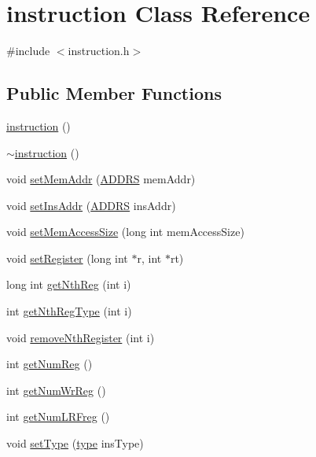 \hypertarget{classinstruction}{
\section{instruction Class Reference}
\label{classinstruction}
}


{\ttfamily \#include $<$instruction.h$>$}

\subsection*{Public Member Functions}
\begin{DoxyCompactItemize}
\item 
\hyperlink{classinstruction_a2e0bfed549166dbfa1ce77ec084ea310}{instruction} ()
\item 
\hyperlink{classinstruction_a4f9c54b6376cf77565179728fa6f68fa}{$\sim$instruction} ()
\item 
void \hyperlink{classinstruction_a69e75dc34c4197b03e33a0032ae03e8f}{setMemAddr} (\hyperlink{global_2global_8h_a7ea74bb9ffd2e4d41550ae2383dd25bc}{ADDRS} memAddr)
\item 
void \hyperlink{classinstruction_ac39145295a94852d0a3efe8c8247473d}{setInsAddr} (\hyperlink{global_2global_8h_a7ea74bb9ffd2e4d41550ae2383dd25bc}{ADDRS} insAddr)
\item 
void \hyperlink{classinstruction_a4e1387f9782160c95597c81694ec0775}{setMemAccessSize} (long int memAccessSize)
\item 
void \hyperlink{classinstruction_a456de8aa26ff79d2b7cd203f7c59f2cb}{setRegister} (long int $\ast$r, int $\ast$rt)
\item 
long int \hyperlink{classinstruction_a54412da0ee022e05101d4fb92ee879b9}{getNthReg} (int i)
\item 
int \hyperlink{classinstruction_a9701f53aafaf1b2298378665059cef33}{getNthRegType} (int i)
\item 
void \hyperlink{classinstruction_aabb46003e886f87cd3bc918f05a3682f}{removeNthRegister} (int i)
\item 
int \hyperlink{classinstruction_af64e1265e882da7e152bd47cb7794c3b}{getNumReg} ()
\item 
int \hyperlink{classinstruction_abe651f9e294dd53e1f515c6856e7e8a3}{getNumWrReg} ()
\item 
int \hyperlink{classinstruction_a71809c767dba335b3bbdad04cb24d43c}{getNumLRFreg} ()
\item 
void \hyperlink{classinstruction_ad9c7d979b5f4b00189973e47caa3411f}{setType} (\hyperlink{binaryTranslator_2global_8h_a7aead736a07eaf25623ad7bfa1f0ee2d}{type} insType)

\end{DoxyCompactItemize}
